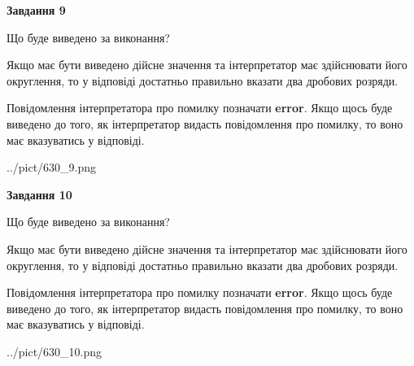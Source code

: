 \documentclass[12pt, ukrainian]{article}
\begin{document}
{\begin {Large}
{\begin {center}\textbf{Завдання 9}\end {center}}\par
Що буде виведено за виконання? \par

Якщо має бути виведено дійсне значення та інтерпретатор має здійснювати його округлення, 
то у відповіді достатньо правильно вказати два дробових розряди.

Повідомлення інтерпретатора про помилку позначати \textbf{error}.
Якщо щось буде виведено до того, як інтерпретатор видасть повідомлення про помилку, 
то воно має вказуватись у відповіді. \par

\begin{center}
	{../pict/630_9.png}
\end{center}
\newpage

{\begin {center}\textbf{Завдання 10}\end {center}}\par
Що буде виведено за виконання? \par

Якщо має бути виведено дійсне значення та інтерпретатор має здійснювати його округлення, 
то у відповіді достатньо правильно вказати два дробових розряди.

Повідомлення інтерпретатора про помилку позначати \textbf{error}.
Якщо щось буде виведено до того, як інтерпретатор видасть повідомлення про помилку, 
то воно має вказуватись у відповіді. \par

\begin{center}
	{../pict/630_10.png}
\end{center}
\newpage

\end {Large}}
\end{document}
